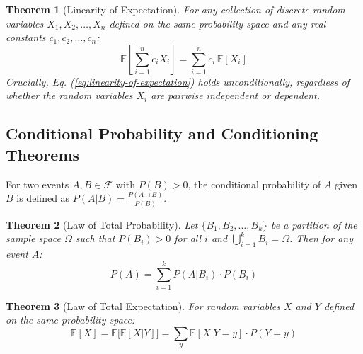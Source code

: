 \documentclass[10pt,journal,compsoc,onecolumn]{IEEEtran}
\newtheorem{theorem}{Theorem}
\begin{document}
\begin{theorem}[Linearity of Expectation]
For any collection of discrete random variables $X_1, X_2, \dots, X_n$ defined on the same probability space and any real constants $c_1, c_2, \dots, c_n$:
\begin{equation}
\mathbb{E}\left[ \sum_{i=1}^{n} c_i X_i \right] = \sum_{i=1}^{n} c_i \, \mathbb{E}[X_i]
\label{eq:linearity-of-expectation}
\end{equation}
Crucially, Eq. (\ref{eq:linearity-of-expectation}) holds unconditionally, regardless of whether the random variables $X_i$ are pairwise independent or dependent.
\end{theorem}

\subsection{Conditional Probability and Conditioning Theorems}

For two events $A, B \in \mathcal{F}$ with $P(B) > 0$, the conditional probability of $A$ given $B$ is defined as $P(A|B) = \frac{P(A \cap B)}{P(B)}$.

\begin{theorem}[Law of Total Probability]
Let $\{B_1, B_2, \dots, B_k\}$ be a partition of the sample space $\Omega$ such that $P(B_i) > 0$ for all $i$ and $\bigcup_{i=1}^k B_i = \Omega$. Then for any event $A$:
\begin{equation}
P(A) = \sum_{i=1}^{k} P(A | B_i) \cdot P(B_i)
\label{eq:law-total-probability}
\end{equation}
\end{theorem}

\begin{theorem}[Law of Total Expectation]
For random variables $X$ and $Y$ defined on the same probability space:
\begin{equation}
\mathbb{E}[X] = \mathbb{E}\big[ \mathbb{E}[X | Y] \big] = \sum_{y} \mathbb{E}[X | Y = y] \cdot P(Y = y)
\label{eq:law-total-expectation}
\end{equation}
\end{theorem}
\end{document}
